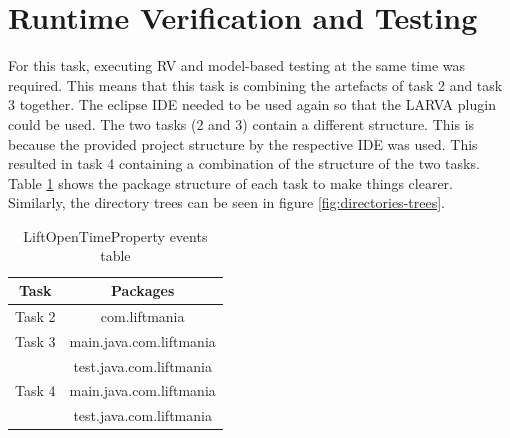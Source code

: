 \documentclass[a4paper, 12pt]{article}
\begin{document}
\section{Runtime Verification and Testing}
For this task, executing RV and model-based testing at the same time was required. This means that this task is combining the artefacts of task 2 and task 3 together.  The eclipse IDE needed to be used again so that the LARVA plugin could be used. The two tasks (2 and 3) contain a different structure. This is because the provided project structure by the respective IDE was used. This resulted in task 4 containing a combination of the structure of the two tasks. Table \ref{tab:packages-structure} shows the package structure of each task to make things clearer. Similarly, the directory trees can be seen in figure \ref{fig:directories-trees}.

\begin{table}[h]
   \centering
   \begin{tabular}{@{}  |c|c| @{}} %
      \toprule
      Task   & Packages \\
      \midrule
      Task 2  &  com.liftmania\\
      Task 3 & main.java.com.liftmania  \\
      & test.java.com.liftmania\\
      Task 4  & main.java.com.liftmania\\
      & test.java.com.liftmania\\
      \bottomrule
   \end{tabular}
   \caption{LiftOpenTimeProperty events table}
   \label{tab:packages-structure}
\end{table}
\end{document}
